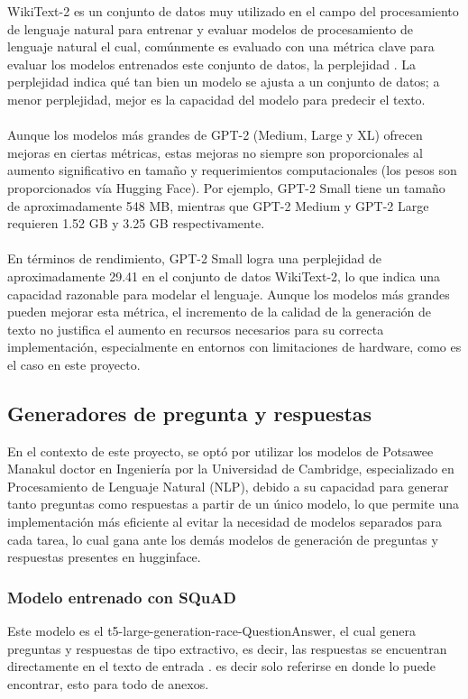 WikiText-2 es un conjunto de datos muy utilizado en el campo del procesamiento de lenguaje natural para entrenar y evaluar modelos de procesamiento de lenguaje natural el cual, comúnmente es evaluado con una métrica clave para evaluar los modelos entrenados este conjunto de datos, la perplejidad \cite{huggperplexity}. La perplejidad indica qué tan bien un modelo se ajusta a un conjunto de datos; a menor perplejidad, mejor es la capacidad del modelo para predecir el texto.
\\
\\
Aunque los modelos más grandes de GPT-2 (Medium, Large y XL) ofrecen mejoras en ciertas métricas, estas mejoras no siempre son proporcionales al aumento significativo en tamaño y requerimientos computacionales (los pesos son proporcionados vía Hugging Face). Por ejemplo, GPT-2 Small tiene un tamaño de aproximadamente 548 MB, mientras que GPT-2 Medium y GPT-2 Large requieren 1.52 GB y 3.25 GB respectivamente.
\\
\\
En términos de rendimiento, GPT-2 Small logra una perplejidad de aproximadamente 29.41 en el conjunto de datos WikiText-2, lo que indica una capacidad razonable para modelar el lenguaje. Aunque los modelos más grandes pueden mejorar esta métrica, el incremento de la calidad de la generación de texto no justifica el aumento en recursos necesarios para su correcta implementación, especialmente en entornos con limitaciones de hardware, como es el caso en este proyecto.


\subsection{Generadores de pregunta y respuestas}

En el contexto de este proyecto, se optó por utilizar los modelos de Potsawee Manakul \cite{manakul2023} doctor en Ingeniería por la Universidad de Cambridge, especializado en Procesamiento de Lenguaje Natural (NLP), debido a su capacidad para generar tanto preguntas como respuestas a partir de un único modelo, lo que permite una implementación más eficiente al evitar la necesidad de modelos separados para cada tarea, lo cual gana ante los demás modelos de generación de preguntas y respuestas presentes en hugginface.

\subsubsection {Modelo entrenado con SQuAD} Este modelo es el t5-large-generation-race-QuestionAnswer, el cual genera preguntas y respuestas de tipo extractivo, es decir, las respuestas se encuentran directamente en el texto de entrada \cite{potsaweesquad}. es decir solo referirse en donde lo puede encontrar, esto para todo de anexos.

